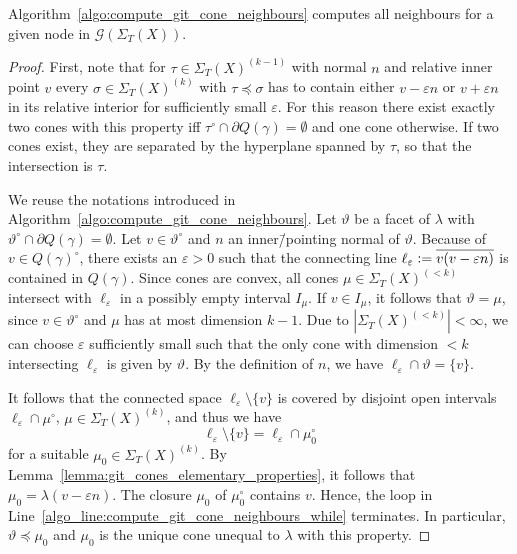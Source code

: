 \begin{prop}
	Algorithm~\ref{algo:compute_git_cone_neighbours} computes all neighbours for a given node in $\mathcal{G}(\Sigma_T(X))$.
\end{prop}

\begin{proof}
	First, note that for $\tau\in\Sigma_T(X)^{(k-1)}$ with normal $n$ and relative inner point $v$ every $\sigma\in\Sigma_T(X)^{(k)}$ with $\tau\preceq\sigma$ has to contain either $v-\varepsilon n$ or $v+\varepsilon n$ in its relative interior for sufficiently small $\varepsilon$. For this reason there exist exactly two cones with this property iff $\tau^\circ\cap\partial Q(\gamma) = \emptyset$ and one cone otherwise. If two cones exist, they are separated by the hyperplane spanned by $\tau$, so that the intersection is $\tau$.
	
	We reuse the notations introduced in Algorithm~\ref{algo:compute_git_cone_neighbours}. Let $\vartheta$ be a facet of $\lambda$ with $\vartheta^\circ\cap\partial Q(\gamma) = \emptyset$.
	Let $v\in\vartheta^\circ$ and $n$ an inner\=/pointing normal of $\vartheta$. Because of $v\in Q(\gamma)^\circ$, there exists an $\varepsilon > 0$ such that the connecting line $\ell_\varepsilon \mathrel{\mathop:}= \overline{v(v-\varepsilon n)}$ is contained in $Q(\gamma)$. Since cones are convex, all cones $\mu\in\Sigma_T(X)^{(<k)}$ intersect with $\ell_\varepsilon$ in a possibly empty interval $I_\mu$. If $v\in I_\mu$, it follows that $\vartheta = \mu$, since $v\in\vartheta^\circ$ and $\mu$ has at most dimension $k-1$. Due to $|\Sigma_T(X)^{(<k)}| < \infty$, we can choose $\varepsilon$ sufficiently small such that the only cone with dimension $<k$ intersecting $\ell_\varepsilon$ is given by $\vartheta$. By the definition of $n$, we have $\ell_\varepsilon \cap \vartheta = \{v\}$.
	
	It follows that the connected space $\ell_\varepsilon \setminus \{v\}$ is covered by disjoint open intervals $\ell_\varepsilon \cap \mu^\circ$, $\mu\in\Sigma_T(X)^{(k)}$, and thus we have $$\ell_\varepsilon \setminus \{v\} = \ell_\varepsilon \cap \mu_0^\circ$$
	for a suitable $\mu_0\in\Sigma_T(X)^{(k)}$. By Lemma~\ref{lemma:git_cones_elementary_properties}, it follows that $\mu_0 = \lambda(v-\varepsilon n)$. The closure $\mu_0$ of $\mu_0^\circ$ contains $v$. Hence, the loop in Line~\ref{algo_line:compute_git_cone_neighbours_while} terminates. In particular, $\vartheta\preceq\mu_0$ and $\mu_0$ is the unique cone unequal to $\lambda$ with this property.
\end{proof}

